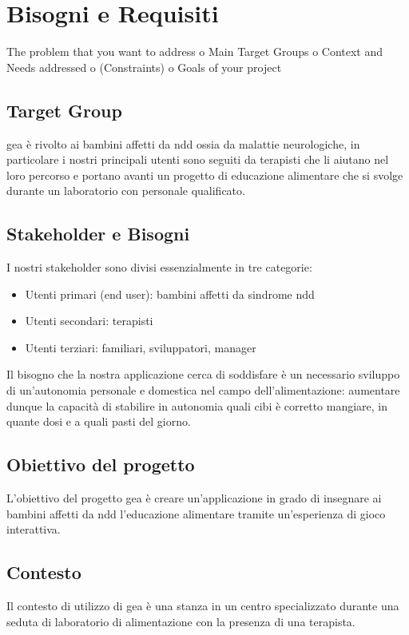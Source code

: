 \section{Bisogni e Requisiti} \label{sec:biso}
The problem that you want to address
o Main Target Groups
o Context and Needs addressed
o (Constraints)
o Goals of your project

\subsection{Target Group} \label{subsec:target}
\acs{gea} è rivolto ai bambini affetti da \acs{ndd} ossia da malattie neurologiche, in particolare i nostri principali utenti sono seguiti da terapisti che li aiutano nel loro percorso e portano avanti un progetto di educazione alimentare che si svolge durante un laboratorio con personale qualificato.

\subsection{Stakeholder e Bisogni} \label{subsec:stakbis}
I nostri stakeholder sono divisi essenzialmente in tre categorie:
\begin{itemize}
\item Utenti primari (end user): bambini affetti da sindrome \acs{ndd}
\item Utenti secondari: terapisti
\item Utenti terziari: familiari, sviluppatori, manager
\end{itemize}
Il bisogno che la nostra applicazione cerca di soddisfare è un necessario sviluppo di un'autonomia personale e domestica nel campo dell'alimentazione: aumentare dunque la capacità di stabilire in autonomia quali cibi è corretto mangiare, in quante dosi e a quali pasti del giorno.


\subsection{Obiettivo del progetto} \label{subsec:obiettivo}
L'obiettivo del progetto \acs{gea} è creare un'applicazione in grado di insegnare ai bambini affetti da \acs{ndd} l'educazione alimentare tramite un'esperienza di gioco interattiva.


\subsection{Contesto} \label{subsec:contesto}
Il contesto di utilizzo di \acs{gea} è una stanza in un centro specializzato durante una seduta di laboratorio di alimentazione con la presenza di una terapista.


